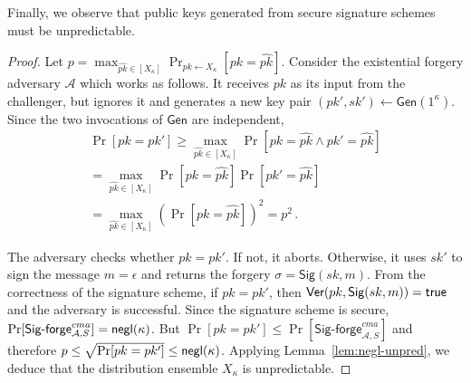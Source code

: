 %
%
%
%
Finally, we observe that public keys generated from secure signature schemes must
be unpredictable.

\restateLemPkUnpredictability*
\begin{proof}
  Let
  $p = \max_{\widehat{pk} \in [X_\kappa]}\Pr_{pk \gets X_\kappa}[pk = \widehat{pk}]$.
  Consider the existential forgery adversary $\mathcal{A}$ which works as
  follows. It receives $pk$ as its input from the challenger, but ignores it
  and generates a new key pair $(pk', sk') \gets \textsf{Gen}(1^\kappa)$.
  Since the
  two invocations of $\textsf{Gen}$ are independent,
  \begin{align*}
    \Pr[pk = pk'] \geq \max_{\widehat{pk} \in [X_\kappa]}\Pr[pk = \widehat{pk} \land pk' = \widehat{pk}]\\
  = \max_{\widehat{pk} \in [X_\kappa]}\Pr[pk = \widehat{pk}]\Pr[pk' = \widehat{pk}]\\
  = \max_{\widehat{pk} \in [X_\kappa]}\left(\Pr[pk = \widehat{pk}]\right)^2
  = p^2
  \,.
  \end{align*}

  The adversary checks
  whether $pk = pk'$. If not, it aborts. Otherwise, it uses $sk'$ to sign the
  message $m = \epsilon$ and returns the forgery $\sigma = \textsf{Sig}(sk, m)$.
  From the correctness of the signature scheme, if $pk = pk'$, then
  $\textsf{Ver}(pk, \textsf{Sig}(sk, m)) = \mathsf{true}$ and the adversary is
  successful. Since the signature scheme is secure,
  $\Pr[\textsf{Sig-forge}^{cma}_{\mathcal{A},S}] = \textsf{negl}(\kappa)$.
  But $\Pr[pk = pk'] \leq \Pr[\textsf{Sig-forge}^{cma}_{\mathcal{A},S}]$ and
  therefore $p \leq \sqrt{\Pr[pk = pk']} \leq \textsf{negl}(\kappa)$. Applying
  Lemma~\ref{lem:negl-unpred}, we deduce that the distribution ensemble $X_\kappa$ is
  unpredictable.
\end{proof}

